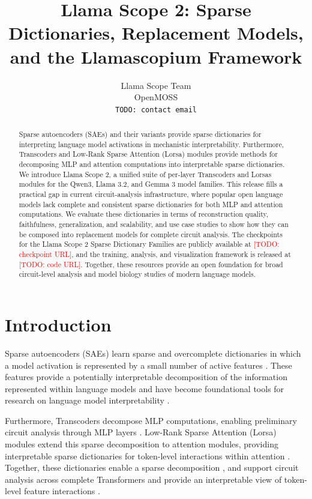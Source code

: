 \documentclass{article}
\title{Llama Scope 2: Sparse Dictionaries, Replacement Models,\\
and the Llamascopium Framework}
\author{Llama Scope Team\\
OpenMOSS\\
\texttt{TODO: contact email}}
\newcommand{\todo}[1]{\textcolor{red}{[TODO: #1]}}
\begin{document}
\maketitle

\begin{abstract}
Sparse autoencoders (SAEs) and their variants provide sparse dictionaries for 
interpreting language model activations in mechanistic interpretability. Furthermore, 
Transcoders and Low-Rank Sparse Attention (Lorsa) modules provide methods for 
decomposing MLP and attention computations into interpretable sparse dictionaries.
We introduce Llama Scope 2, a unified suite of per-layer
Transcoders and Lorsas modules for the Qwen3,
Llama 3.2, and Gemma 3 model families. This release fills a practical gap in
current circuit-analysis infrastructure, where popular open language models
lack complete and consistent sparse dictionaries for both MLP and attention
computations. We evaluate these dictionaries in terms of reconstruction
quality, faithfulness, generalization, and scalability, and use case studies to
show how they can be composed into replacement models for complete circuit
analysis. The checkpoints for the Llama Scope 2 Sparse Dictionary Families are
publicly available at \todo{checkpoint URL}, and the training, analysis, and
visualization framework is released at \todo{code URL}. Together, these
resources provide an open foundation for broad circuit-level analysis and model
biology studies of modern language models.
\end{abstract}

\section{Introduction}
\label{sec:introduction}

Sparse autoencoders (SAEs) learn sparse and overcomplete dictionaries in which a model
activation is represented by a small number of active features \citep{bricken2023monosemanticity, cunningham2023sae}. 
These features provide a potentially interpretable decomposition of the information represented within language models 
and have become foundational tools for research on language model interpretability 
\citep{he2024llamascope, lieberum2024gemma, deng2026qwenscope}.

Furthermore, Transcoders decompose MLP computations, enabling preliminary circuit analysis through 
MLP layers \citep{dunefsky2024transcoder}. 
Low-Rank Sparse Attention (Lorsa) modules extend this sparse decomposition to attention modules, 
providing interpretable sparse dictionaries for token-level interactions within attention \citep{he2025lorsa}.
Together, these dictionaries enable a sparse decomposition , 
and support circuit  analysis across complete Transformers and provide an interpretable 
view of token-level feature interactions \citep{shu2026completereplacement}.
\end{document}
